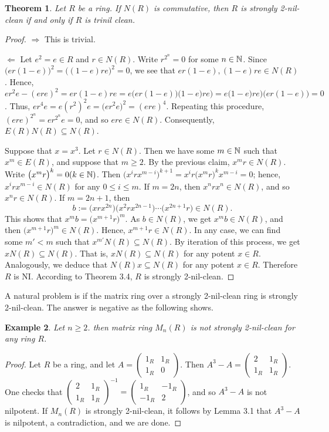 \documentclass[12pt, reqno]{amsart}
\newtheorem{thm}{Theorem}[section]
\newtheorem{exam}[thm]{Example}
\numberwithin{equation}{section}
\begin{document}
\begin{thm} Let $R$ be a ring. If $N(R)$ is commutative, then $R$ is strongly 2-nil-clean if and only if $R$ is trinil clean.
\end{thm}
\begin{proof} $\Longrightarrow$ This is trivial.

$\Longleftarrow$ Let $e^2=e\in R$
and $r\in N(R)$. Write $r^{2^n}=0$ for some $n\in {\Bbb N}$. Since
$\big(er(1-e)\big)^2=\big((1-e)re\big)^2=0$, we see that $er(1-e),
(1-e)re\in N(R)$. Hence,
$er^2e-(ere)^2=er(1-e)re=e\big(er(1-e)\big)\big(1-e)re\big)=e\big(1-e)re\big)\big(er(1-e)\big)=0$.
Thus, $er^4e=e(r^2)^2e=\big(er^2e\big)^2=(ere)^4$. Repeating this
procedure, $(ere)^{2^n}=er^{2^n}e=0$, and so $ere\in N(R)$.
Consequently, $E(R)N(R)\subseteq N(R)$.

Suppose that $x=x^3$. Let $r\in N(R)$. Then we have some $m\in {\Bbb N}$
such that $x^m\in E(R)$, and suppose that $m\geq 2$. By the
previous claim, $x^mr\in N(R)$. Write $\big(x^mr\big)^k=0 (k\in
{\Bbb N})$. Then
$\big(x^irx^{m-i}\big)^{k+1}=x^ir\big(x^mr\big)^kx^{m-i}=0$;
hence, $x^irx^{m-i}\in N(R)$ for any $0\leq i\leq m$. If $m=2n$,
then $x^nrx^n\in N(R)$, and so $x^nr\in N(R)$. If $m=2n+1$, then
$$b:=\big(xrx^{2n}\big)\big(x^2rx^{2n-1}\big)\cdots
\big(x^{2n+1}r\big)\in N(R).$$ This shows that
$x^mb=\big(x^{m+1}r\big)^m$. As $b\in N(R)$, we get $x^mb\in
N(R)$, and then $\big(x^{m+1}r\big)^m\in N(R)$. Hence,
$x^{m+1}r\in N(R)$. In any case, we can find some $m'<m$ such that
$x^{m'}N(R)\subseteq N(R)$. By iteration of this process, we get
$xN(R)\subseteq N(R)$. That is, $xN(R)\subseteq N(R)$ for any potent $x\in R$.
Analogously, we deduce that $N(R)x\subseteq N(R)$ for any potent $x\in R$. Therefore $R$ is NI.
According to Theorem 3.4, $R$ is strongly 2-nil-clean.\end{proof}

A natural problem is if the matrix ring over a strongly 2-nil-clean ring is strongly 2-nil-clean. The answer is negative as the following shows.

\begin{exam} Let $n\geq 2$. then matrix ring $M_n(R)$ is not strongly 2-nil-clean for any ring $R$.
\end{exam}
\begin{proof} Let $R$ be a ring, and let $A=\left(
\begin{array}{cc}
1_R&1_R\\
1_R&0
\end{array}
\right)$. Then $A^3-A=\left(
\begin{array}{cc}
2&1_R\\
1_R&1_R
\end{array}
\right)$. One checks that $\left(
\begin{array}{cc}
2&1_R\\
1_R&1_R
\end{array}
\right)^{-1}=\left(
\begin{array}{cc}
1_R&-1_R\\
-1_R&2
\end{array}
\right)$, and so $A^3-A$ is not nilpotent. If $M_n(R)$ is strongly 2-nil-clean, it follows by Lemma 3.1 that $A^3-A$ is nilpotent, a contradiction, and we are done.\end{proof}
\end{document}
